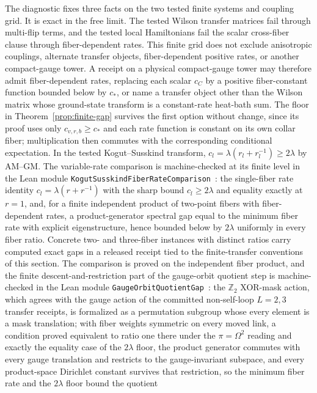 \documentclass[11pt]{article}
\numberwithin{equation}{section}
\theoremstyle{remark}
\begin{document}
The diagnostic fixes three facts on the two tested finite systems and coupling
grid. It is exact in the free limit. The tested Wilson transfer matrices fail
through multi-flip terms, and the tested local Hamiltonians fail the scalar
cross-fiber clause through fiber-dependent rates. This finite grid does not
exclude anisotropic couplings, alternate transfer objects, fiber-dependent
positive rates, or another compact-gauge tower. A receipt on a physical
compact-gauge tower may therefore admit fiber-dependent rates, replacing each scalar \(c_C\)
by a positive fiber-constant function bounded below by \(c_*\), or name a
transfer object other than the Wilson matrix whose ground-state transform is
a constant-rate heat-bath sum. The floor in Theorem~\ref{prop:finite-gap}
survives the first option without change, since its proof uses only
\(c_{v,r,b}\ge c_*\) and each rate function is constant on its own collar
fiber; multiplication then commutes with the corresponding conditional
expectation. In the tested Kogut--Susskind transform,
\(c_l=\lambda(r_l+r_l^{-1})\ge2\lambda\) by AM--GM. The variable-rate
comparison is machine-checked at its finite level in the Lean module
\texttt{KogutSusskindFiberRateComparison}~\cite{ophlean}: the single-fiber
rate identity \(c_l=\lambda(r+r^{-1})\) with the sharp bound
\(c_l\ge2\lambda\) and equality exactly at \(r=1\), and, for a finite
independent product of two-point fibers with fiber-dependent rates, a
product-generator spectral gap equal to the minimum fiber rate with explicit
eigenstructure, hence bounded below by \(2\lambda\) uniformly in every fiber
ratio. Concrete two- and three-fiber instances with distinct ratios carry
computed exact gaps in a released receipt tied to the finite-transfer
conventions of this section. The comparison is proved on the independent
fiber product, and the finite descent-and-restriction part of the
gauge-orbit quotient step is machine-checked in the Lean module
\texttt{GaugeOrbitQuotientGap}~\cite{ophlean}: the \(\mathbb Z_2\)
XOR-mask action, which agrees with the gauge action of the committed
non-self-loop \(L=2,3\) transfer receipts, is formalized as a permutation
subgroup whose every element is a mask translation; with fiber weights
symmetric on every moved link, a condition proved equivalent to ratio one
there under the \(\pi=\Omega^2\) reading and exactly the equality case of
the \(2\lambda\) floor, the product generator commutes with every gauge
translation and restricts to the gauge-invariant subspace, and every
product-space Dirichlet constant survives that restriction, so the
minimum fiber rate and the \(2\lambda\) floor bound the quotient
\end{document}
